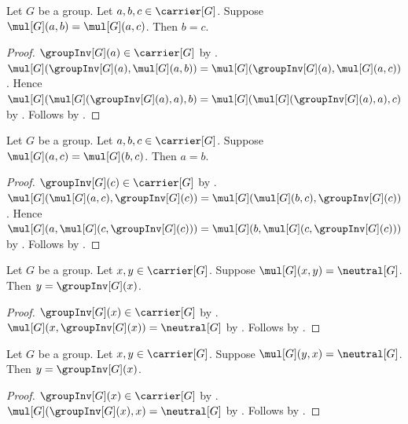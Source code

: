 \begin{theorem}\label{group_cancel_left}
    Let $G$ be a group.
    Let $a,b,c\in\carrier[G]$.
    Suppose $\mul[G](a,b)=\mul[G](a,c)$.
    Then $b=c$.
\end{theorem}
\begin{proof}
    $\groupInv[G](a)\in\carrier[G]$
        by .
    $\mul[G](\groupInv[G](a),\mul[G](a,b))
        =\mul[G](\groupInv[G](a),\mul[G](a,c))$.
    Hence
    $\mul[G](\mul[G](\groupInv[G](a),a),b)
        =\mul[G](\mul[G](\groupInv[G](a),a),c)$
        by .
    Follows by
        .
\end{proof}

\begin{theorem}\label{group_cancel_right}
    Let $G$ be a group.
    Let $a,b,c\in\carrier[G]$.
    Suppose $\mul[G](a,c)=\mul[G](b,c)$.
    Then $a=b$.
\end{theorem}
\begin{proof}
    $\groupInv[G](c)\in\carrier[G]$
        by .
    $\mul[G](\mul[G](a,c),\groupInv[G](c))
        =\mul[G](\mul[G](b,c),\groupInv[G](c))$.
    Hence
    $\mul[G](a,\mul[G](c,\groupInv[G](c)))
        =\mul[G](b,\mul[G](c,\groupInv[G](c)))$
        by .
    Follows by
        .
\end{proof}

\begin{theorem}\label{group_inverse_unique_right}
    Let $G$ be a group.
    Let $x,y\in\carrier[G]$.
    Suppose $\mul[G](x,y)=\neutral[G]$.
    Then $y=\groupInv[G](x)$.
\end{theorem}
\begin{proof}
    $\groupInv[G](x)\in\carrier[G]$
        by .
    $\mul[G](x,\groupInv[G](x))=\neutral[G]$
        by .
    Follows by .
\end{proof}

\begin{theorem}\label{group_inverse_unique_left}
    Let $G$ be a group.
    Let $x,y\in\carrier[G]$.
    Suppose $\mul[G](y,x)=\neutral[G]$.
    Then $y=\groupInv[G](x)$.
\end{theorem}
\begin{proof}
    $\groupInv[G](x)\in\carrier[G]$
        by .
    $\mul[G](\groupInv[G](x),x)=\neutral[G]$
        by .
    Follows by .
\end{proof}

